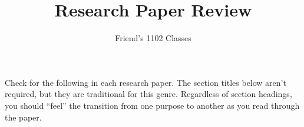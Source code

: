 \documentclass[10pt,article,oneside]{memoir}
\author{Friend's 1102 Classes}
\title{Research Paper Review}%
\begin{document}

\settitle %


\settitle %


Check for the following in each research paper. The section titles below aren't required, but they are traditional for this genre. Regardless of section headings, you should ``feel'' the transition from one purpose to another as you read through the paper.
\end{document}
